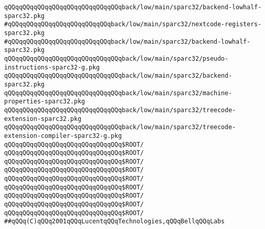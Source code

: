 \newline
\verb|qQQqqQQqqQQqqQQqqQQqqQQqqQQqqQQqback/low/main/sparc32/backend-lowhalf-sparc32.pkg|\newline
\verb|#qQQqqQQqqQQqqQQqqQQqqQQqqQQqback/low/main/sparc32/nextcode-registers-sparc32.pkg|\newline
\verb|#qQQqqQQqqQQqqQQqqQQqqQQqqQQqback/low/main/sparc32/backend-lowhalf-sparc32.pkg|\newline
\verb|qQQqqQQqqQQqqQQqqQQqqQQqqQQqqQQqback/low/main/sparc32/pseudo-instructions-sparc32-g.pkg|\newline
\verb|qQQqqQQqqQQqqQQqqQQqqQQqqQQqqQQqback/low/main/sparc32/backend-sparc32.pkg|\newline
\verb|qQQqqQQqqQQqqQQqqQQqqQQqqQQqqQQqback/low/main/sparc32/machine-properties-sparc32.pkg|\newline
\newline
\verb|qQQqqQQqqQQqqQQqqQQqqQQqqQQqqQQqback/low/main/sparc32/treecode-extension-sparc32.pkg|\newline
\verb|qQQqqQQqqQQqqQQqqQQqqQQqqQQqqQQqback/low/main/sparc32/treecode-extension-compiler-sparc32-g.pkg|\newline
\newline
\verb|qQQqqQQqqQQqqQQqqQQqqQQqqQQqqQQq$ROOT/|\newline
\verb|qQQqqQQqqQQqqQQqqQQqqQQqqQQqqQQq$ROOT/|\newline
\verb|qQQqqQQqqQQqqQQqqQQqqQQqqQQqqQQq$ROOT/|\newline
\newline
\verb|qQQqqQQqqQQqqQQqqQQqqQQqqQQqqQQq$ROOT/|\newline
\verb|qQQqqQQqqQQqqQQqqQQqqQQqqQQqqQQq$ROOT/|\newline
\verb|qQQqqQQqqQQqqQQqqQQqqQQqqQQqqQQq$ROOT/|\newline
\verb|qQQqqQQqqQQqqQQqqQQqqQQqqQQqqQQq$ROOT/|\newline
\verb|qQQqqQQqqQQqqQQqqQQqqQQqqQQqqQQq$ROOT/|\newline
\verb|qQQqqQQqqQQqqQQqqQQqqQQqqQQqqQQq$ROOT/|\newline
\newline
\newline
\verb|##qQQq(C)qQQq2001qQQqLucentqQQqTechnologies,qQQqBellqQQqLabs|\newline


